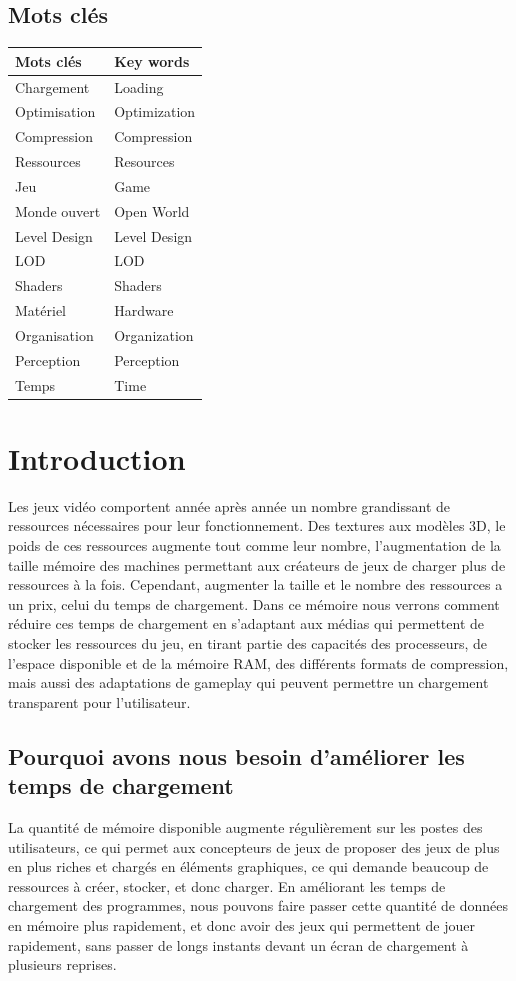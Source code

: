 \documentclass[a4paper, 12pt]{article} %
\begin{document}
\subsection{Mots clés}
\begin{center}
	\begin{tabular}{|p{}|p{}|}
		\hline
		Mots clés & Key words\\
		\hline
		Chargement&Loading\\
		Optimisation&Optimization\\
		Compression&Compression\\
		Ressources&Resources\\
		Jeu&Game\\
		Monde ouvert&Open World\\
		Level Design&Level Design\\
		LOD&LOD\\
		Shaders&Shaders\\
		Matériel&Hardware\\
		Organisation&Organization\\
		Perception&Perception\\
		Temps&Time\\
		\hline
	\end{tabular}
\end{center}

\newpage

\section{Introduction}
Les jeux vidéo comportent année après année un nombre grandissant de ressources nécessaires pour leur fonctionnement. Des textures aux modèles 3D, le poids de ces ressources augmente tout comme leur nombre, l'augmentation de la taille mémoire des machines permettant aux créateurs de jeux de charger plus de ressources à la fois. Cependant, augmenter la taille et le nombre des ressources a un prix, celui du temps de chargement. Dans ce mémoire nous verrons comment réduire ces temps de chargement en s'adaptant aux médias qui permettent de stocker les ressources du jeu, en tirant partie des capacités des processeurs, de l'espace disponible et de la mémoire RAM, des différents formats de compression, mais aussi des adaptations de gameplay qui peuvent permettre un chargement transparent pour l'utilisateur.

\subsection[Pourquoi améliorer les temps de chargement]{Pourquoi avons nous besoin d'améliorer les temps de chargement}
La quantité de mémoire disponible augmente régulièrement sur les postes des utilisateurs, ce qui permet aux concepteurs de jeux de proposer des jeux de plus en plus riches et chargés en éléments graphiques, ce qui demande beaucoup de ressources à créer, stocker, et donc charger. En améliorant les temps de chargement des programmes, nous pouvons faire passer cette quantité de données en mémoire plus rapidement, et donc avoir des jeux qui permettent de jouer rapidement, sans passer de longs instants devant un écran de chargement à plusieurs reprises.
\end{document}

